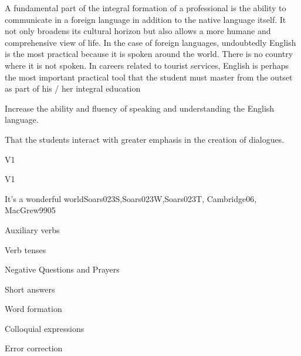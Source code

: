 \begin{syllabus}


\begin{justification}
A fundamental part of the integral formation of a professional is the ability to communicate in a foreign language in addition to the native language itself.
It not only broadens its cultural horizon but also allows a more humane and comprehensive view of life. In the case of foreign languages, undoubtedly English is the most practical because it is spoken around the world. There is no country where it is not spoken. In careers related to tourist services, English is perhaps the most important practical tool that the student must master from the outset as part of his / her integral education
\end{justification}

\begin{goals}
\item Increase the ability and fluency of speaking and understanding the English language.
\item That the students interact with greater emphasis in the creation of dialogues.
\end{goals}

\begin{competences}{V1}
    \item {}
\end{competences}

\begin{outcomes}{V1}
\item {}
\item {}
\end{outcomes}

\begin{unit}{It's a wonderful world}{}{Soars023S,Soars023W,Soars023T, Cambridge06, MacGrew99}{0}{5}
   \begin{topics}
      \item Auxiliary verbs
      \item Verb tenses
      \item Negative Questions and Prayers
      \item Short answers
      \item Word formation
      \item Colloquial expressions
      \item Error correction
   \end{topics}


\end{unit}
\end{syllabus}
